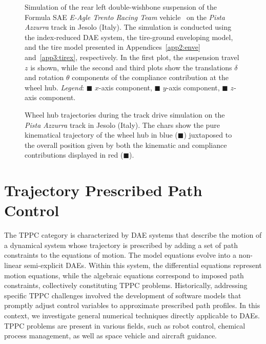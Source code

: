 \begin{figure}[htbp]
  \centering
  \small{}
  \caption{Simulation of the rear left double-wishbone suspension of the Formula SAE \textit{E-Agle Trento Racing Team} vehicle~\cite{eagle} on the \textit{Pista Azzurra} track in Jesolo (Italy). The simulation is conducted using the index-reduced \ac{DAE} system, the tire-ground enveloping model, and the tire model presented in Appendices~\ref{app2:enve} and~\ref{app3:tirex}, respectively. In the first plot, the suspension travel $z$ is shown, while the second and third plots show the translations $\delta$ and rotation $\theta$ components of the compliance contribution at the wheel hub. \emph{Legend}: {\color{mycolor1}$\blacksquare$} $x$-axis component, {\color{mycolor2}$\blacksquare$} $y$-axis component, {\color{mycolor3}$\blacksquare$} $z$-axis component.}
  \label{chap5:fig:suspension_pista_azzurra}
\end{figure}

\begin{figure}[!htp]
  \centering
  \small{}
  \small{}
  \caption{Wheel hub trajectories during the track drive simulation on the \emph{Pista Azzurra} track in Jesolo (Italy). The chars show the pure kinematical trajectory of the wheel hub in blue ({\color{mycolor1}$\blacksquare$}) juxtaposed to the overall position given by both the kinematic and compliance contributions displayed in red ({\color{mycolor2}$\blacksquare$}).}
  \label{chap5:fig:kine_compliance}
\end{figure}

\section{Trajectory Prescribed Path Control}
\label{chap5:sec:tppc}

The \ac{TPPC} category is characterized by \ac{DAE} systems that describe the motion of a dynamical system whose trajectory is prescribed by adding a set of path constraints to the equations of motion. The model equations evolve into a non-linear semi-explicit \acp{DAE}. Within this system, the differential equations represent motion equations, while the algebraic equations correspond to imposed path constraints, collectively constituting \ac{TPPC} problems. Historically, addressing specific \ac{TPPC} challenges involved the development of software models that promptly adjust control variables to approximate prescribed path profiles. In this context, we investigate general numerical techniques directly applicable to \acp{DAE}. \ac{TPPC} problems are present in various fields, such as robot control, chemical process management, as well as space vehicle and aircraft guidance.

